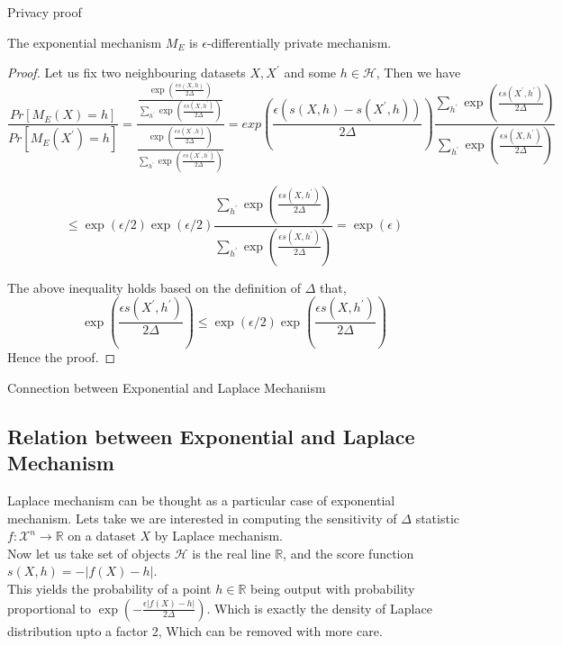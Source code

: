 \documentclass[aspectratio=169]{beamer}
\begin{document}
\begin{frame}[allowframebreaks]{Privacy proof}
\begin{small}
\begin{theorem}
The exponential mechanism $M_E$ is $\epsilon$-differentially private mechanism.
\end{theorem}

\begin{proof}
Let us fix two neighbouring datasets $X, X^\prime$ and some $h \in \mathscr{H}$, Then we have
$$\frac{Pr[M_E(X)=h]}{Pr[M_E(X^\prime)=h]}=\frac{\frac{\exp(\frac{\epsilon s(X,h)}{2\Delta})}{\sum_{h^\prime} \exp(\frac{\epsilon s(X,h^\prime)}{2\Delta})}}  {\frac{\exp(\frac{\epsilon s(X^\prime,h)}{2\Delta})}{\sum_{h^\prime} \exp(\frac{\epsilon s(X^\prime,h^\prime)}{2\Delta})}}=exp(\frac{\epsilon (s(X,h) - s(X^\prime,h))}{2\Delta})  \frac{\sum_{h^\prime} \exp(\frac{\epsilon s(X^\prime,h^\prime)}{2\Delta})}{\sum_{h^\prime} \exp(\frac{\epsilon s(X,h^\prime)}{2\Delta})}$$

$$\leq \exp(\epsilon/2) \exp(\epsilon/2) \frac{\sum_{h^\prime} \exp(\frac{\epsilon s(X,h^\prime)}{2\Delta})}{\sum_{h^\prime} \exp(\frac{\epsilon s(X,h^\prime)}{2\Delta})}=\exp(\epsilon)$$

The above inequality holds based on the definition of $\Delta$ that,
$$\exp(\frac{\epsilon s(X^\prime,h^\prime)}{2\Delta}) \leq \exp(\epsilon/2) \exp(\frac{\epsilon s(X,h^\prime)}{2\Delta})$$
Hence the proof.
\end{proof}
\end{small}
\end{frame}



\begin{frame}{Connection between Exponential and Laplace Mechanism}
\subsection{Relation between Exponential and Laplace Mechanism}
Laplace mechanism can be thought as a particular case of exponential mechanism. Lets take we are interested in computing the sensitivity of $\Delta$ statistic $f:\mathscr{X}^n \rightarrow \mathbb{R}$ on a dataset $X$ by Laplace mechanism.\\
Now let us take set of objects $\mathscr{H}$ is the real line $\mathbb{R}$, and the score function $s(X,h)=-|f(X)-h|$.\\
This yields the probability of a point $h \in \mathbb{R}$ being output with probability proportional to $\exp(-\frac{\epsilon|f(X)-h|}{2\Delta})$. Which is exactly the density of Laplace distribution upto a factor 2, Which can be removed with more care.\\
\end{frame}
\end{document}
